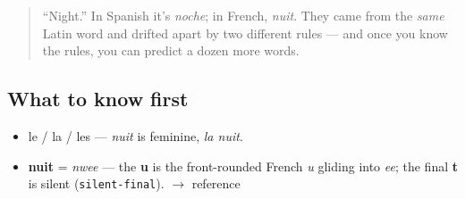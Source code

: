 \label{lesson:FR-C01-nuit}



\begin{quote}
\textquotedblleft{}Night.\textquotedblright{} In Spanish it's \emph{noche}; in French, \emph{nuit}. They came from the \emph{same} Latin word and drifted apart by two different rules — and once you know the rules, you can predict a dozen more words.
\end{quote}

\subsection*{What to know first}
\begin{itemize}
\raggedright
  \item le / la / les — \emph{nuit} is feminine, \emph{la nuit}.
\end{itemize}

\begin{sounds}
\begin{itemize}
\raggedright
  \item \textbf{nuit} = \emph{nwee} — the \textbf{u} is the front-rounded French \emph{u} gliding into \emph{ee}; the final \textbf{t} is silent (\texttt{silent-final}). $\to$ reference
\end{itemize}
\end{sounds}


